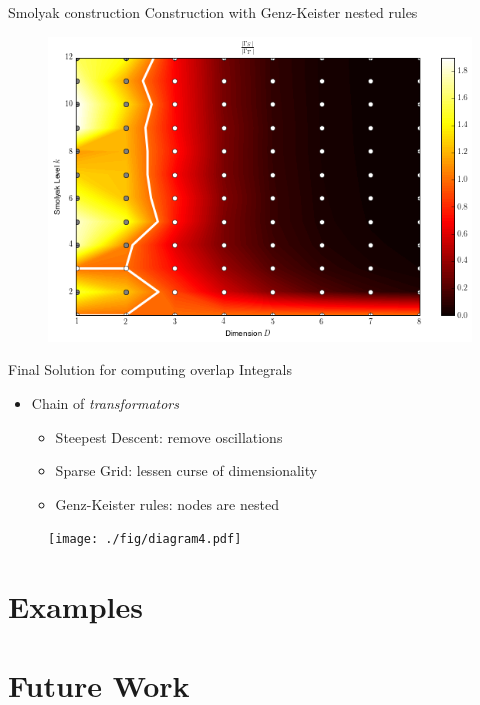 \documentclass{beamer}
\begin{document}
\begin{frame}{Smolyak construction}
  Construction with Genz-Keister nested rules
  \begin{figure}
    \centering
    \includegraphics[width=0.8\linewidth]{./fig/smolyak_genzkeister_ratiomap.png}
  \end{figure}
\end{frame}


\begin{frame}{Final Solution for computing overlap Integrals}
  \begin{itemize}
    \item Chain of \emph{transformators}
    \begin{itemize}
      \item Steepest Descent: remove oscillations
      \item Sparse Grid: lessen curse of dimensionality
      \item Genz-Keister rules: nodes are nested
    \end{itemize}
  \end{itemize}
  \begin{figure}
    \centering
    \texttt{[image: ./fig/diagram4.pdf]}
  \end{figure}
\end{frame}



\section{Examples}




\section{Future Work}
\end{document}

